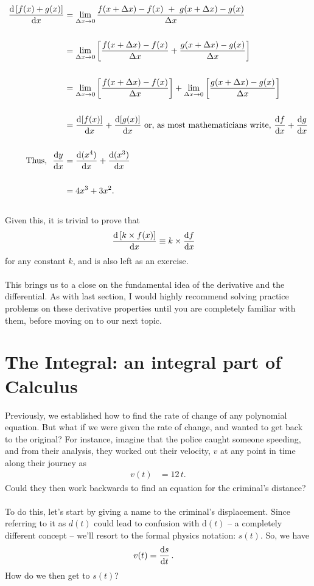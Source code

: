 \documentclass[11pt]{article}
\numberwithin{equation}{section}
\begin{document}
\begin{align*}
	\frac{\textrm{d}\left[ f(x) + g(x) \right]}{\textrm{d}x} &= \lim_{\Delta x \to 0} \frac{f(x + \Delta x) - f(x) \ + \  g(x + \Delta x) - g(x)}{\Delta x} \\ \\
	&= \lim_{\Delta x \to 0} \left[ \frac{f(x + \Delta x) - f(x)}{\Delta x} + \frac{g(x + \Delta x) - g(x)}{\Delta x} \right] \\ \\
	&= \lim_{\Delta x \to 0} \left[ \frac{f(x + \Delta x) - f(x)}{\Delta x} \right] + \lim_{\Delta x \to 0} \left[ \frac{g(x + \Delta x) - g(x)}{\Delta x} \right] \\ \\
	&= \frac{\textrm{d}[f(x)]}{\textrm{d}x} + \frac{\textrm{d}[g(x)]}{\textrm{d}x} \ \textrm{or, as most mathematicians write, } \frac{\textrm{d}f}{\textrm{d}x} + \frac{\textrm{d}g}{\textrm{d}x} \\ \\
	\textrm{Thus, } \ \frac{\textrm{d}y}{\textrm{d}x} &= \frac{\textrm{d}(x^4)}{\textrm{d}x} + \frac{\textrm{d}(x^3)}{\textrm{d}x} \\ \\ &= 4x^3 + 3x^2.
\end{align*}
\\ Given this, it is trivial to prove that 
\begin{align*}
	\frac{\textrm{d}\, [k \times f(x)]}{\textrm{d}x} & \equiv k \times \frac{\textrm{d}f}{\textrm{d}x}
\end{align*}
for any constant \(k\), and is also left as an exercise.
\\ \\ This brings us to a close on the fundamental idea of the derivative and the differential. As with last section, I would highly recommend solving practice problems on these derivative properties until you are completely familiar with them, before moving on to our next topic.

\newpage
\section{The Integral: an integral part of Calculus}
Previously, we established how to find the rate of change of any polynomial equation. But what if we were given the rate of change, and wanted to get back to the original? For instance, imagine that the police caught someone speeding, and from their analysis, they worked out their velocity, \(v\) at any point in time along their journey as
\begin{align*}
	v(t) &= 12 \, t.
\end{align*} 
Could they then work backwards to find an equation for the criminal's distance? 
\\ \\ To do this, let's start by giving a name to the criminal's displacement. Since referring to it as \(d(t)\) could lead to confusion with \(\textrm{d}(t)\) -- a completely different concept -- we'll resort to the formal physics notation: \(s(t)\). So, we have 
\begin{align*}
v(t) &= \frac{\textrm{d}s}{\textrm{d}t} \, .
\end{align*}
How do we then get to \(s(t)\)? 
\end{document}
